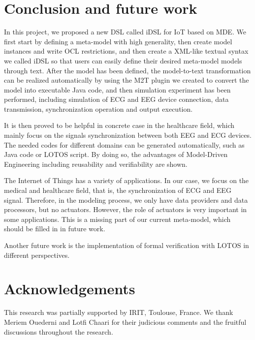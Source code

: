 \documentclass[11pt, oneside]{article}   	%
\begin{document}
\section{Conclusion and future work}
\indent \par In this project, we proposed a new DSL called iDSL for IoT based on MDE. We first start by defining a meta-model with high generality, then create model instances and write OCL restrictions, and then create a XML-like textual syntax we called iDSL so that users can easily define their desired meta-model models through text. After the model has been defined, the model-to-text transformation can be realized automatically by using the M2T plugin we created to convert the model into executable Java code, and then simulation experiment has been performed, including simulation of ECG and EEG device connection, data transmission, synchronization operation and output execution.\\
\indent \par It is then proved to be helpful in concrete case in the healthcare field, which mainly focus on the signals synchronization between both EEG and ECG devices. The needed codes for different domains can be generated automatically, such as Java code or LOTOS script. By doing so, the advantages of Model-Driven Engineering including reusability and verifiability are shown.\\
\indent \par The Internet of Things has a variety of applications. In our case, we focus on the medical and healthcare field, that is, the synchronization of ECG and EEG signal. Therefore, in the modeling process, we only have data providers and data processors, but no actuators. However, the role of actuators is very important in some applications. This is a missing part of our current meta-model, which should be filled in in future work.\\
\indent \par Another future work is the implementation of formal verification with LOTOS in different perspectives. 


\section*{Acknowledgements}
\indent \par This research was partially supported by IRIT, Toulouse, France. We thank Meriem Ouederni and Lotfi Chaari for their judicious comments and the fruitful discussions throughout the research. 
\end{document}
